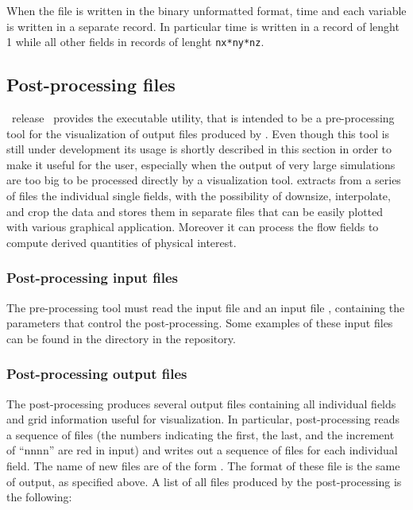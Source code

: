 When the file is written in the binary unformatted format,
time and each variable is written in a separate record.
In particular time is written in a record of lenght 1
while all other fields in records of lenght {\tt nx*ny*nz}.

\subsection{Post-processing files}
\label{sect:pp}

\PDAC\ release \PDACVERSION\ provides the executable  utility,
that is intended to be a pre-processing tool for the visualization of
output files produced by \PDAC. Even though this tool is still under 
development its usage is shortly described in this section in order to make it
useful for the user, especially when the output of very large simulations
are too big to be processed directly by a visualization tool.
 extracts from a series of  files the individual single fields,
with the possibility of downsize, interpolate, and crop the data
and stores them in separate files that can be easily plotted with
various graphical application. Moreover it can process the flow fields to
compute derived quantities of physical interest.

\subsubsection{Post-processing input files}

The pre-processing tool must read the input file  and an
input file , containing the parameters that control the post-processing.
Some examples of these input files can be found in the  directory
in the repository.

\subsubsection{Post-processing output files}

The post-processing produces several output files
containing all individual fields and grid information useful
for visualization.
In particular, post-processing  reads a sequence
of  files (the numbers indicating the first, the last, and
the increment of ``nnnn'' are red in input)
and writes out a sequence of files for each individual field.
The name of new files are of the form .
The format of these file is the same of output, as specified above.
A list of all files produced by the post-processing is the following:


